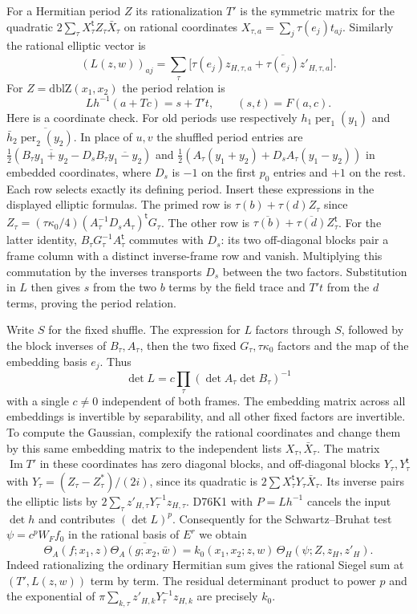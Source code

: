 For a Hermitian period $Z$ its rationalization $T'$ is the
symmetric matrix for the quadratic
$2\sum_\tau X_\tau^{\mathsf t}Z_\tau\bar X_\tau$ on rational
coordinates $X_{\tau,a}=\sum_j\tau(e_j)t_{aj}$. Similarly the
rational elliptic vector is
\[
 (L(z,w))_{aj}=\sum_\tau
 \big[\tau(e_j)z_{H,\tau,a}+\overline{\tau(e_j)}z'_{H,\tau,a}\big].
\]
For $Z=\mathrm{dblZ}(x_1,x_2)$ the period relation is
\[
   Lh^{-1}(a+T c)=s+T't,\qquad (s,t)=F(a,c).
\]
Here is a coordinate check. For old periods use respectively
$h_1\operatorname{per}_1(y_1)$ and
$\bar h_2\overline{\operatorname{per}_2(y_2)}$. In place of
$u,v$ the shuffled period entries are
$\tfrac12(B_\tau\overline{y_1+y_2}
       -D_s B_\tau\overline{y_1-y_2})$ and
$\tfrac12(A_\tau(y_1+y_2)+D_s A_\tau(y_1-y_2))$ in embedded
coordinates, where $D_s$ is $-1$ on the first $p_0$ entries and
$+1$ on the rest. Each row selects exactly its defining period.
Insert these expressions in the displayed elliptic formulas. The
primed row is $\tau(b)+\tau(d)Z_\tau$ since
$Z_\tau=(\tau\kappa_0/4)(A_\tau^{-1}D_s A_\tau)^{\mathsf t}G_\tau$.
The other row is $\overline{\tau(b)}+
\overline{\tau(d)} Z_\tau^{\mathsf t}$.
For the latter identity, $B_\tau G_\tau^{-1} A_\tau^{\mathsf t}$
commutes with $D_s$: its two off-diagonal blocks pair a frame
column with a distinct inverse-frame row and vanish. Multiplying
this commutation by the inverses transports $D_s$ between the
two factors. Substitution in $L$ then gives $s$ from the two
$b$ terms by the field trace and $T't$ from the $d$ terms, proving
the period relation.

Write $S$ for the fixed shuffle. The expression for $L$ factors
through $S$, followed by the block inverses of $B_\tau,A_\tau$,
then the two fixed $G_\tau,\tau\kappa_0$ factors and the map of
the embedding basis $e_j$. Thus
\[
 \det L=c\prod_\tau(\det A_\tau\det B_\tau)^{-1}
\]
with a single $c\ne0$ independent of both frames. The embedding
matrix across all embeddings is invertible by separability, and
all other fixed factors are invertible. To compute the Gaussian,
complexify the rational coordinates and change them by this same
embedding matrix to the independent lists $X_\tau,\bar X_\tau$.
The matrix $\operatorname{Im}T'$ in these coordinates has zero
diagonal blocks, and off-diagonal blocks $Y_\tau,Y_\tau^{\mathsf t}$
with $Y_\tau=(Z_\tau-Z_\tau^*)/(2i)$, since its quadratic is
$2\sum X_\tau^{\mathsf t}Y_\tau\bar X_\tau$. Its inverse pairs
the elliptic lists by $2\sum_\tau z'_{H,\tau}Y_\tau^{-1}z_{H,\tau}$.
D76K1 with $P=Lh^{-1}$ cancels the input $\det h$ and contributes
$(\det L)^p$. Consequently for the Schwartz--Bruhat test
$\psi=c^p W_F f_0$ in the rational basis of $E^r$ we obtain
\[
 \Theta_A(f;x_1,z)\overline{\Theta_A(g;x_2,\bar w)}
 = k_0(x_1,x_2;z,w)\,
       \Theta_H(\psi;Z,z_H,z'_H).
\]
Indeed rationalizing the ordinary Hermitian sum gives the rational
Siegel sum at $(T',L(z,w))$ term by term. The residual determinant
product to power $p$ and the exponential of
$\pi\sum_{k,\tau}z'_{H,k}Y_\tau^{-1}z_{H,k}$ are precisely $k_0$.

